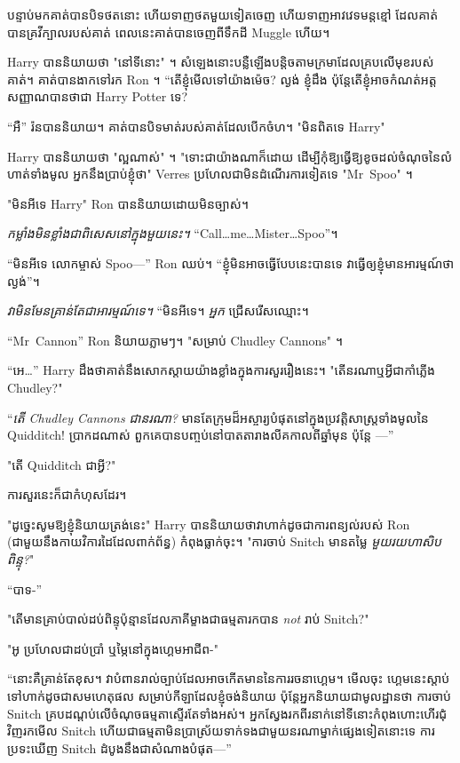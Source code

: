 បន្ទាប់មកគាត់បានបិទថតនោះ ហើយទាញថតមួយទៀតចេញ ហើយទាញអាវវេទមន្តខ្មៅ ដែលគាត់បានគ្រវីក្បាលរបស់គាត់ ពេលនេះគាត់បានចេញពីទឹកដី Muggle ហើយ។

Harry បាននិយាយថា "នៅទីនោះ" ។ សំឡេង​នោះ​បន្លឺ​ឡើង​បន្តិច​តាម​ក្រមា​ដែល​គ្រប​លើ​មុខ​របស់​គាត់។ គាត់បានងាកទៅរក Ron ។ “តើខ្ញុំមើលទៅយ៉ាងម៉េច? ល្ងង់ ខ្ញុំដឹង ប៉ុន្តែតើខ្ញុំអាចកំណត់អត្តសញ្ញាណបានថាជា Harry Potter ទេ?

“អឺ” រ៉នបាននិយាយ។ គាត់បានបិទមាត់របស់គាត់ដែលបើកចំហ។ "មិនពិតទេ Harry"

Harry បាននិយាយថា "ល្អណាស់" ។ "ទោះជាយ៉ាងណាក៏ដោយ ដើម្បីកុំឱ្យធ្វើឱ្យខូចដល់ចំណុចនៃលំហាត់ទាំងមូល អ្នកនឹងប្រាប់ខ្ញុំថា" Verres ប្រហែលជាមិនដំណើរការទៀតទេ "Mr~Spoo" ។

"មិនអីទេ Harry" Ron បាននិយាយដោយមិនច្បាស់។

\emph{កម្លាំងមិនខ្លាំងជាពិសេសនៅក្នុងមួយនេះ។} “Call…me…Mister…Spoo”។

“មិនអីទេ លោកម្ចាស់ Spoo—” Ron ឈប់។ “ខ្ញុំ​មិន​អាច​ធ្វើ​បែប​នេះ​បាន​ទេ វា​ធ្វើ​ឲ្យ​ខ្ញុំ​មាន​អារម្មណ៍​ថា​ល្ងង់”។

\emph{វាមិនមែនគ្រាន់តែជាអារម្មណ៍ទេ។} “មិនអីទេ។ \emph{អ្នក} ជ្រើសរើសឈ្មោះ។

“Mr~Cannon” Ron និយាយភ្លាមៗ។ "សម្រាប់ Chudley Cannons" ។

“អេ…” Harry ដឹងថាគាត់នឹងសោកស្តាយយ៉ាងខ្លាំងក្នុងការសួររឿងនេះ។ "តើនរណាឬអ្វីជាកាំភ្លើង Chudley?"

“\emph{តើ Chudley Cannons ជានរណា?} មានតែក្រុមដ៏អស្ចារ្យបំផុតនៅក្នុងប្រវត្តិសាស្រ្តទាំងមូលនៃ Quidditch! ប្រាកដណាស់ ពួកគេបានបញ្ចប់នៅបាតតារាងលីគកាលពីឆ្នាំមុន ប៉ុន្តែ —”

"តើ Quidditch ជាអ្វី?"

ការសួរនេះក៏ជាកំហុសដែរ។

"ដូច្នេះសូមឱ្យខ្ញុំនិយាយត្រង់នេះ" Harry បាននិយាយថាវាហាក់ដូចជាការពន្យល់របស់ Ron (ជាមួយនឹងកាយវិការដៃដែលពាក់ព័ន្ធ) កំពុងធ្លាក់ចុះ។ "ការចាប់ Snitch មានតម្លៃ \emph{មួយរយហាសិបពិន្ទុ?}"

“បាទ-”

"តើមានគ្រាប់បាល់ដប់ពិន្ទុប៉ុន្មានដែលភាគីម្ខាងជាធម្មតារកបាន \emph{not} រាប់ Snitch?"

"អូ ប្រហែលជាដប់ប្រាំ ឬម្ភៃនៅក្នុងហ្គេមអាជីព-"

“នោះ​គឺ​គ្រាន់​តែ​ខុស។ វាបំពានរាល់ច្បាប់ដែលអាចកើតមាននៃការរចនាហ្គេម។ មើលចុះ ហ្គេមនេះស្តាប់ទៅហាក់ដូចជាសមហេតុផល សម្រាប់កីឡាដែលខ្ញុំចង់និយាយ ប៉ុន្តែអ្នកនិយាយជាមូលដ្ឋានថា ការចាប់ Snitch គ្របដណ្ដប់លើចំណុចធម្មតាស្ទើរតែទាំងអស់។ អ្នកស្វែងរកពីរនាក់នៅទីនោះកំពុងហោះហើរជុំវិញរកមើល Snitch ហើយជាធម្មតាមិនប្រាស្រ័យទាក់ទងជាមួយនរណាម្នាក់ផ្សេងទៀតនោះទេ ការប្រទះឃើញ Snitch ដំបូងនឹងជាសំណាងបំផុត—”

